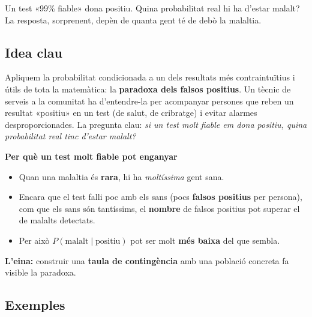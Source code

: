 %
{Un test «99\% fiable» dona positiu. Quina probabilitat real hi ha d'estar malalt? La resposta, sorprenent, depèn de quanta gent té de debò la malaltia.}

\subsection{Idea clau}

Apliquem la probabilitat condicionada a un dels resultats més contraintuïtius i útils de
tota la matemàtica: la \textbf{paradoxa dels falsos positius}. Un tècnic de serveis a la
comunitat ha d'entendre-la per acompanyar persones que reben un resultat «positiu» en un
test (de salut, de cribratge) i evitar alarmes desproporcionades. La pregunta clau:
\emph{si un test molt fiable em dona positiu, quina probabilitat real tinc d'estar
malalt?}

\begin{idea}
\textbf{Per què un test molt fiable pot enganyar}
\begin{itemize}[leftmargin=1.4em, itemsep=2pt]
  \item Quan una malaltia és \textbf{rara}, hi ha \emph{moltíssima} gent sana.
  \item Encara que el test falli poc amb els sans (pocs \textbf{falsos positius} per
        persona), com que els sans són tantíssims, el \textbf{nombre} de falsos positius
        pot superar el de malalts detectats.
  \item Per això $P(\text{malalt}\mid\text{positiu})$ pot ser molt \textbf{més baixa} del
        que sembla.
\end{itemize}
\textbf{L'eina:} construir una \textbf{taula de contingència} amb una població concreta
fa visible la paradoxa.
\end{idea}

\subsection{Exemples}

